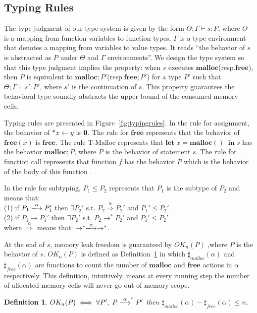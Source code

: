 \documentclass[english]{jssst_ppl} %
\newcommand\LET{\mathbf{let}\;}
\newcommand\IN{\mathbf{in}\;}
\newcommand\MALLOC{\mathbf{malloc()}\;}
\newcommand\Malloc{\mathbf{malloc}}
\newcommand\Free{\mathbf{free}}
\newcommand\Cirx{(x)}
\newtheorem{myDef}{Definition}
\theoremstyle{definition}
\begin{document}
\subsection{Typing Rules}
The type judgment of our type system is given by the form $\Theta ; \Gamma \vdash s : P$, where $\Theta$ is a mapping from function variables to function types, $\Gamma$ is a type environment that denotes a mapping from variables to value types.
It reads ``the behavior of $s$ is abstracted as $P$ under $\Theta$ and $\Gamma$ environments''. We design the type system so that this type judgment implies the property: when $s$ executes $\Malloc$(resp.$\Free$), then $P$ is equivalent to $\Malloc;P'$(resp.$\Free;P'$) for a type $P'$ such that $\Theta; \Gamma \vdash s': P'$, where $s'$ is the continuation of $s$. This property guarantees the behavioral type soundly abstracts the upper bound of the consumed memory cells.

Typing rules are presented in Figure~\ref{fig:typingrules}. In the rule for assignment, the behavior of  $*x \leftarrow y$ is $\bf 0$. The rule for $\Free$ represents that the behavior of $\Free \Cirx$ is $\Free$. The rule T-Malloc represents that $\LET x = \MALLOC \; \IN s$ has the behavior $\Malloc;P$, where $P$ is the behavior of statement $s$. The rule for function call represents that function $f$ has the behavior $P$ which is the behavior of the body of this function .

In the rule for subtyping, $P_{1} \le P_{2}$ represents that $P_{1}$ is the subtype of $P_{2}$ and  means that: \\
(1) if $P_{1} \xlongrightarrow{\alpha}  P_{1}'$ then $\exists P_{2}' $ s.t. $P_{2} \overset{\text{$\alpha$}}{\Longrightarrow} P_{2}'$ and $ P_{1}' \le P_{2}' $\\
(2) if $P_{1} \rightarrow P_{1}'$ then $\exists P_{2}'$ s.t. $P_{2} \rightarrow^{*} P_{2}'$ and  $P_{1}' \le P_{2}'$\\
where $\overset{\text{$\alpha$}}{\Longrightarrow}$ means that: $\rightarrow^{*} \xlongrightarrow{\alpha} \rightarrow^{*}$.

At the end of $s$, memory leak freedom is guaranteed by $OK_{n}(P)$ ,where $P$ is the behavior of $s$. $OK_{n}(P)$ is defined as Definition~\ref{df:okn} in which $\sharp_{malloc}(\alpha)$ and $\sharp_{free}(\alpha)$ are functions to count the number of $\Malloc$ and $\Free$ actions in $\alpha$ respectively. This definition, intuitively, means at every running step the number of allocated memory cells will never go out of memory scope.
\begin{myDef}
  $OK_{n}(P) \iff \forall P',\; P \xlongrightarrow{\alpha}^{*}P'$ then $\sharp_{malloc}(\alpha)-\sharp_{free}(\alpha)\le n$.
\label{df:okn}
\end{myDef}
\end{document}
